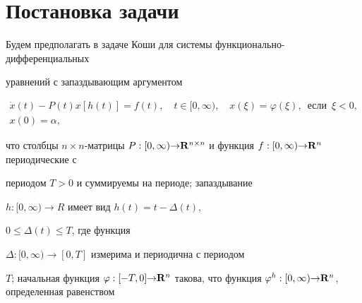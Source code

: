

\pagestyle{plain} %







\maketitle


\label{begin}





\section{Постановка задачи}





Будем предполагать в задаче Коши для системы функционально-дифференциальных


уравнений с запаздывающим аргументом


\begin{gather}


\Dot{x}(t)-P(t)x[h(t)]=f(t), \quad t\in [0,\infty), \quad


x(\xi)=\varphi(\xi), \ \; \text{если} \ \; \xi <0, \\


%


x(0)={\alpha},


\end{gather}


что столбцы $n\times n$-матрицы $P:[0,{\infty}){\to}{{\bold R}^{n\times


n}}$ и функция $f:[0,{\infty}){\to}{{\bold R}^n}$ периодические с


периодом $T>0$ и суммируемы на периоде; запаздывание


$h:[0,{\infty}){\to}R$ имеет вид $h(t)=t-{\Delta}(t)$,


$0{\le}{\Delta}(t){\le}T$, где функция


${\Delta}:[0,{\infty}){\to}[0,T]$ измерима и периодична с периодом


$T$; начальная функция ${\varphi}:[-T,0]{\to}{{\bold


R}^n}$ такова, что функция ${\varphi}^h:[0,{\infty}){\to}{{\bold


R}^n}$, определенная равенством


